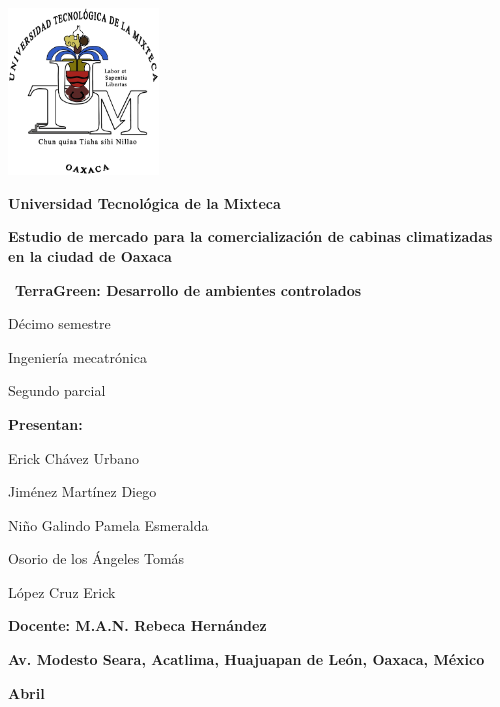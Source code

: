\begin{titlepage}
\begin{center}


\includegraphics[width=40mm]{cover/utm.png} \\

\large

\textbf{Universidad Tecnológica de la Mixteca}

\vspace{.5cm}
\large
\textbf{Estudio de mercado para la comercialización de cabinas climatizadas en la ciudad de Oaxaca} 

\vspace{.5cm}

\huge{\ \textbf{TerraGreen: Desarrollo de ambientes controlados} }

\vspace{.5cm}

\large
Décimo semestre

Ingeniería mecatrónica

Segundo parcial

\Large
\textbf{Presentan:}

Erick Chávez Urbano

Jiménez Martínez Diego

Niño Galindo Pamela Esmeralda

Osorio de los Ángeles Tomás

López Cruz Erick

\vfill

\large
\textbf{Docente: M.A.N. Rebeca Hernández}

\textbf{Av. Modesto Seara, Acatlima, Huajuapan de León, Oaxaca, México}

\textbf{Abril \the\year}

\end{center}
\end{titlepage}



